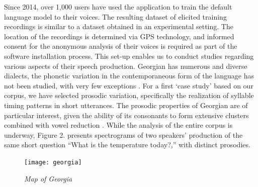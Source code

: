 \documentclass[12pt]{amsart}
\begin{document}
Since 2014, over 1,000 users have used the application to train the default
language model to their voices. The resulting dataset of elicited
training recordings is similar to a dataset obtained in an experimental setting.
The location of the recordings is determined via GPS technology, and informed
consent for the anonymous analysis of their voices is required as part of the
software installation process. This set-up enables us to conduct
studies regarding various aspects of their speech production. Georgian has numerous
 and diverse dialects, the phonetic variation in
the contemporaneous form of the language has not been studied, with very few
exceptions \cite{Ch, CGB}. For a first `case study' based on our corpus, we
have selected prosodic variation, specifically the realization of syllable timing
patterns in short utterances. The prosodic properties of Georgian are of
particular interest, given the ability of its consonants to form extensive
clusters \cite{Ch} combined with vowel reduction \cite{Bu}.
While the analysis of the entire corpus is underway, Figure 2. presents
spectrograms of two speakers' production of the same short question ``What is
the temperature today?,'' with distinct prosodies.


\newpage

\begin{figure}
    \centering
        \texttt{[image: georgia]}
    \caption{\footnotesize{\textit{\textsc{} Map of Georgia}}}\label{fig:georgia}
\end{figure}
\end{document}
